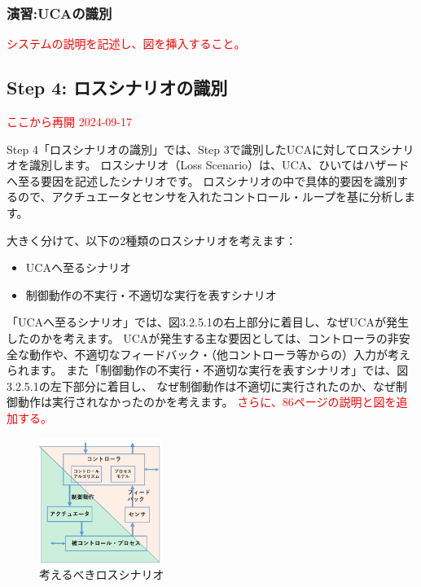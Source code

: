 \subsubsection{演習:UCAの識別} %

\textcolor{red}{システムの説明を記述し、図を挿入すること。}

\subsection{Step 4: ロスシナリオの識別}

\textcolor{red}{ここから再開 2024-09-17}

Step 4「ロスシナリオの識別」では、Step 3で識別したUCAに対してロスシナリオを識別します。
ロスシナリオ（Loss Scenario）は、UCA、ひいてはハザードへ至る要因を記述したシナリオです。
ロスシナリオの中で具体的要因を識別するので、アクチュエータとセンサを入れたコントロール・ループを基に分析します。

大きく分けて、以下の2種類のロスシナリオを考えます：
%
\begin{itemize}
    \item UCAへ至るシナリオ
    \item 制御動作の不実行・不適切な実行を表すシナリオ
\end{itemize}
%
「UCAへ至るシナリオ」では、図3.2.5.1の右上部分に着目し、なぜUCAが発生したのかを考えます。
UCAが発生する主な要因としては、コントローラの非安全な動作や、不適切なフィードバック・（他コントローラ等からの）入力が考えられます。 %
また「制御動作の不実行・不適切な実行を表すシナリオ」では、図3.2.5.1の左下部分に着目し、
なぜ制御動作は不適切に実行されたのか、なぜ制御動作は実行されなかったのかを考えます。
\textcolor{red}{さらに、86ページの説明と図を追加する。}
%
\begin{figure}[H]
    \centering
    \includegraphics[width=40mm]{safety_assurance_contents/ch3images/fig-3-2-5-01.png}
    \caption[short]{考えるべきロスシナリオ}
\end{figure}

